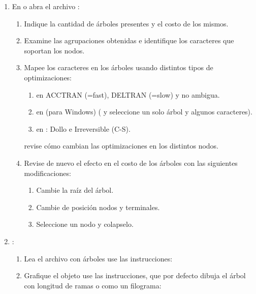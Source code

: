 \begin{enumerate}
	\item En  o  abra el archivo :
	\begin{enumerate}
		\item Indique la cantidad de \'arboles presentes y el costo de los mismos.
		\item Examine las agrupaciones obtenidas e identifique los caracteres que soportan los nodos.
		\item Mapee los caracteres en los \'arboles usando distintos tipos de optimizaciones: 
		\begin{enumerate}
			\item en  ACCTRAN (=fast), DELTRAN (=slow) y no ambigua.
			\item en  (para Windows) ( y seleccione un solo \'arbol y algunos caracteres).
			\item en : Dollo e Irreversible (C-S).
		\end{enumerate}	
		revise c\'omo cambian las optimizaciones en los distintos nodos.
		\item Revise de nuevo el efecto en el costo de los \'arboles con las siguientes modificaciones:
		\begin{enumerate}
			\item Cambie la ra\'iz del \'arbol.
			\item Cambie de posici\'on nodos y terminales.
			\item Seleccione un nodo y colapselo.
		\end{enumerate}
	\end{enumerate}

	

	\item \En {}:
	\begin{enumerate}

		\item Lea el archivo con \'arboles  use las instrucciones:
		\item Grafique el objeto  use las instrucciones, que por defecto dibuja el \'arbol con longitud de ramas o como un filograma:


\end{enumerate}
\end{enumerate}
